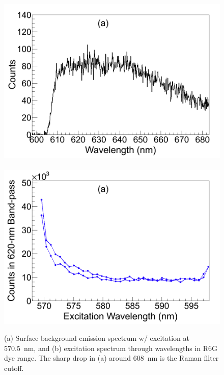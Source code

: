 \begin{figure} %
        \centering
                \includegraphics[width=.5\textwidth]{figures/surfaceBG_a.png}
                ~
                \includegraphics[width=.5\textwidth]{figures/surfaceBG_b.png}
                \caption{(a) Surface background emission spectrum w/ excitation at 570.5~nm, and (b) excitation spectrum through wavelengths in R6G dye range.  The sharp drop in (a) around 608~nm is the Raman filter cutoff.}
\label{fig:surfBG}
\end{figure}





